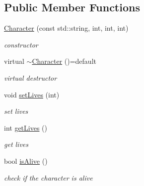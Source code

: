 \subsection*{Public Member Functions}
\begin{DoxyCompactItemize}
\item 
\mbox{\label{class_character_a83f1f8a2eb47e7a891ef14e673703e15}} 
\mbox{\hyperlink{class_character_a83f1f8a2eb47e7a891ef14e673703e15}{Character}} (const std\+::string, int, int, int)
\begin{DoxyCompactList}\small\item\em constructor \end{DoxyCompactList}\item 
\mbox{\label{class_character_a3333a88ae593c36b229c90371e935d42}} 
virtual \mbox{\hyperlink{class_character_a3333a88ae593c36b229c90371e935d42}{$\sim$\+Character}} ()=default
\begin{DoxyCompactList}\small\item\em virtual destructor \end{DoxyCompactList}\item 
\mbox{\label{class_character_a5c979ca4dd41c717ff7f6a620c67c0ff}} 
void \mbox{\hyperlink{class_character_a5c979ca4dd41c717ff7f6a620c67c0ff}{set\+Lives}} (int)
\begin{DoxyCompactList}\small\item\em set lives \end{DoxyCompactList}\item 
\mbox{\label{class_character_a95b485165df76e581b04cda3391e43ab}} 
int \mbox{\hyperlink{class_character_a95b485165df76e581b04cda3391e43ab}{get\+Lives}} ()
\begin{DoxyCompactList}\small\item\em get lives \end{DoxyCompactList}\item 
\mbox{\label{class_character_aa49f985b1b05751b2d4b3de74b4acc8c}} 
bool \mbox{\hyperlink{class_character_aa49f985b1b05751b2d4b3de74b4acc8c}{is\+Alive}} ()
\begin{DoxyCompactList}\small\item\em check if the character is alive \end{DoxyCompactList}\item 

\end{DoxyCompactItemize}
